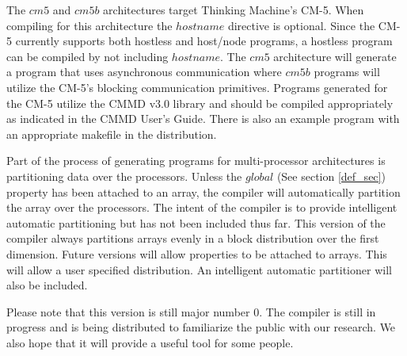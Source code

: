 The $cm5$ and $cm5b$ architectures target Thinking Machine's CM-5.  When
compiling for this architecture the $hostname$ directive is optional.  Since
the CM-5 currently supports both hostless and host/node programs, a hostless
program can be compiled by not including $hostname$.  The $cm5$ architecture
will generate a program that uses asynchronous communication where $cm5b$
programs will utilize the CM-5's blocking communication primitives.  Programs
generated for the CM-5 utilize the CMMD v3.0 library and should be compiled 
appropriately as indicated in the CMMD User's Guide.  There is also an
example program with an appropriate makefile in the distribution.

Part of the process of generating programs for multi-processor architectures
is partitioning data over the processors.  Unless the $global$ (See
section \ref{def_sec}) property has been attached to an array, the compiler
will automatically partition the array over the processors.  The intent of 
the compiler is to provide intelligent automatic partitioning but has not
been included thus far.  This version of the compiler always partitions 
arrays evenly in a block distribution over the first dimension.  Future
versions will allow properties to be attached to arrays.  This will allow
a user specified distribution.  An intelligent automatic partitioner will
also be included.

Please note that this version is still major number 0.  The compiler is still
in progress and is being distributed to familiarize the public with our 
research.  We also hope that it will provide a useful tool for some people.


